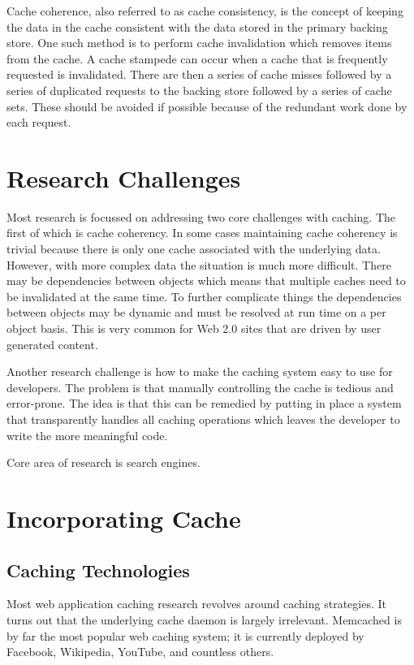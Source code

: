 \documentclass[12pt]{article}
\begin{document}
Cache coherence, also referred to as cache consistency, is the concept of keeping the data in the cache consistent with the data stored in the primary backing store.
One such method is to perform cache invalidation which removes items from the cache.
A cache stampede can occur when a cache that is frequently requested is invalidated.
There are then a series of cache misses followed by a series of duplicated requests to the backing store followed by a series of cache sets.
These should be avoided if possible because of the redundant work done by each request.

\section{Research Challenges}
Most research is focussed on addressing two core challenges with caching.
The first of which is cache coherency.
In some cases maintaining cache coherency is trivial because there is only one cache associated with the underlying data.
However, with more complex data the situation is much more difficult.
There may be dependencies between objects which means that multiple caches need to be invalidated at the same time.
To further complicate things the dependencies between objects may be dynamic and must be resolved at run time on a per object basis.
This is very common for Web 2.0 sites that are driven by user generated content.

Another research challenge is how to make the caching system easy to use for developers.
The problem is that manually controlling the cache is tedious and error-prone.
The idea is that this can be remedied by putting in place a system that transparently handles all caching operations which leaves the developer to write the more meaningful code.

Core area of research is search engines. %

\section{Incorporating Cache}
\subsection{Caching Technologies}
Most web application caching research revolves around caching strategies.
It turns out that the underlying cache daemon is largely irrelevant.
Memcached is by far the most popular web caching system; it is currently deployed by Facebook, Wikipedia, YouTube, and countless others.\cite{memcachedDotOrg}
\end{document}

